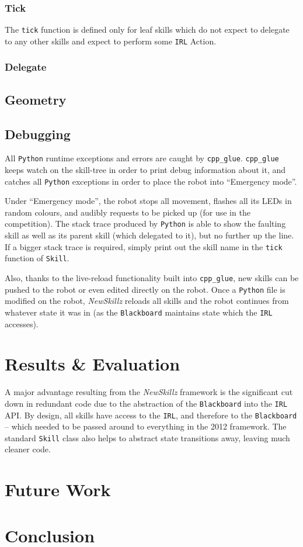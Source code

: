 \subsubsection{Tick}

The \texttt{tick} function is defined only for leaf skills which do not expect to delegate to any other skills and expect to perform some \texttt{IRL} Action.

\subsubsection{Delegate}
\label{sec:delegate}

\subsection{Geometry}

\subsection{Debugging} 

All \verb!Python! runtime exceptions and errors are caught by \texttt{cpp\_glue}. \texttt{cpp\_glue} keeps watch on the skill-tree in order to print debug information about it, and catches all \verb!Python! exceptions in order to place the robot into ``Emergency mode''.

Under ``Emergency mode'', the robot stops all movement, flashes all its LEDs in random colours, and audibly requests to be picked up (for use in the competition). The stack trace produced by \verb!Python! is able to show the faulting skill as well as its parent skill (which delegated to it), but no further up the line. If a bigger stack trace is required, simply print out the skill name in the \texttt{tick} function of \texttt{Skill}.

Also, thanks to the live-reload functionality built into \texttt{cpp\_glue}, new skills can be pushed to the robot or even edited directly on the robot. Once a \verb!Python! file is modified on the robot, \textit{NewSkillz} reloads all skills and the robot continues from whatever state it was in (as the \texttt{Blackboard} maintains state which the \texttt{IRL} accesses).

\section{Results \& Evaluation}

A major advantage resulting from the \textit{NewSkillz} framework is the significant cut down in redundant code due to the abstraction of the \texttt{Blackboard} into the \texttt{IRL} API. By design, all skills have access to the \texttt{IRL}, and therefore to the \texttt{Blackboard} -- which needed to be passed around to everything in the 2012 framework. The standard \texttt{Skill} class also helps to abstract state transitions away, leaving much cleaner code.

\section{Future Work}


\section{Conclusion}
